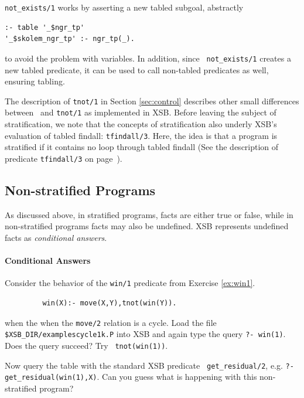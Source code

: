 {\tt not\_exists/1} works by
asserting a new tabled subgoal, abstractly 
\begin{verbatim}
:- table '_$ngr_tp'
'_$skolem_ngr_tp' :- ngr_tp(_).
\end{verbatim}
to avoid the problem with variables.  In addition, since {\tt
  not\_exists/1} creates a new tabled predicate, it can be used to call
non-tabled predicates as well, ensuring tabling.

The description of {\tt tnot/1} in Section \ref{sec:control} describes
other small differences between \not \ and {\tt tnot/1} as implemented
in XSB\@. Before leaving the subject of stratification, we note that the
concepts of stratification also underly XSB's evaluation of tabled
findall: {\tt tfindall/3}.  Here, the idea is that a program is
stratified if it contains no loop through tabled findall (See the
description of predicate {\tt tfindall/3} on
page~\pageref{tfindall/3}).

\subsection{Non-stratified Programs}

As discussed above, in stratified programs, facts are either true or
false, while in non-stratified programs facts may also be undefined.
XSB represents undefined facts as {\em conditional answers}.

\paragraph*{Conditional Answers} \label{sec:conditional-answers}

\begin{exercise}
Consider the behavior of the {\tt win/1} predicate from Exercise
\ref{ex:win1}.
\begin{verbatim}
         win(X):- move(X,Y),tnot(win(Y)).
\end{verbatim}
when the when the {\tt move/2} relation is a cycle.  Load the file
{\tt \verb|$XSB_DIR/examples|cycle1k.P} into XSB and again type the
query {\tt ?- win(1)}.  Does the query succeed?  Try {\tt
tnot(win(1))}.

Now query the table with the standard XSB predicate {\tt
get\_residual/2}, e.g. {\tt ?- get\_residual(win(1),X)}.  Can you guess
what is happening with this non-stratified program?
\end{exercise}

